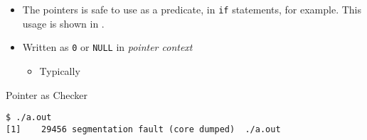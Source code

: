 \begin{itemize}[noitemsep]
\item The  pointers is safe to use as a predicate, in \texttt{if} statements, for example.
  This usage is shown in .
\item Written as \texttt{0} or \texttt{NULL} in \emph{pointer context}
  \begin{itemize}
  \item Typically 
  \end{itemize}
\end{itemize}

\begin{listing}[h!tbp]
\caption{\texorpdfstring{}{\texttt{NULL}} Pointer as Checker}
\label{lst:NULL_Pointer-Checker}

\begin{verbatim}
$ ./a.out
[1]    29456 segmentation fault (core dumped)  ./a.out
\end{verbatim}
\end{listing}


